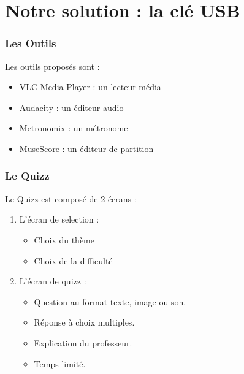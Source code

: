\section{Notre solution : la clé USB}
\begin{frame}
\tableofcontents[currentsection]
\end{frame}

\begin{frame}
  \frametitle{Les Outils}
  Les outils proposés sont :
  \begin{itemize}
    \item VLC Media Player : un lecteur média
    \item Audacity : un éditeur audio
    \item Metronomix : un métronome
    \item MuseScore : un éditeur de partition
  \end{itemize}
\end{frame}

\begin{frame}
  \frametitle{Le Quizz}
  Le Quizz est composé de 2 écrans :
  \begin{enumerate}
    \item L'écran de selection :
    \begin{itemize}
      \item Choix du thème
      \item Choix de la difficulté
    \end{itemize}

    \item L'écran de quizz :
      \begin{itemize}
      \item Question au format texte, image ou son.
      \item Réponse à choix multiples.
      \item Explication du professeur.
      \item Temps limité.
      \end{itemize}
  \end{enumerate}
\end{frame}
